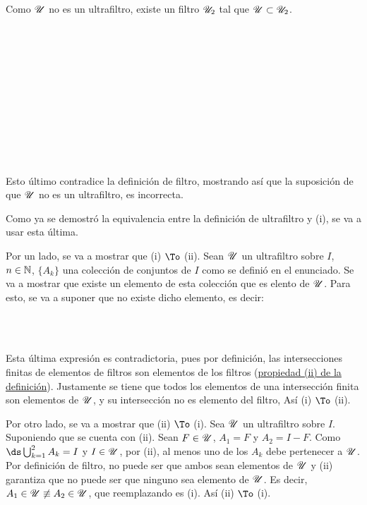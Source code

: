 \begin{demo}[i]
  Como $\mathscr{U}$ no es un ultrafiltro, existe un filtro $\mathscr{U}_2$ tal que
  $\mathscr{U} \subset \mathscr{U}_2$.
  \begin{longderivation}
      \\
    \equiv\\
      \\
    \\
      \\
    \\
      \\
    \equiv\\
      \\
    \\
  \end{longderivation}
  Esto último contradice la definición de filtro, mostrando así que la
  suposición de que $\mathscr{U}$ no es un ultrafiltro, es incorrecta.
\end{demo}
\begin{demo}[ii]
  Como ya se demostró la equivalencia entre la definición de
  ultrafiltro y (i), se va a usar esta última.

  Por un lado, se va a mostrar que (i) $\To$ (ii).
  Sean $\mathscr{U}$ un ultrafiltro sobre $I$, $n\in\mathbb{N}$, $\{A_k\}$ una colección
  de conjuntos de $I$ como se definió en el enunciado. Se va a mostrar
  que existe un elemento de esta colección que es elento de $\mathscr{U}$. Para
  esto, se va a suponer que no existe dicho elemento, es decir:
  \begin{longderivation}
      \\
    \\
  \end{longderivation}
  Esta última expresión es contradictoria, pues por definición, las
  intersecciones finitas de elementos de filtros son elementos de los
  filtros (\hyperref[def:filtro]{propiedad (ii) de la definición}).
  Justamente se tiene que todos los elementos de una intersección finita
  son elementos de $\mathscr{U}$, y su intersección no es elemento del filtro, Así
  (i) $\To$ (ii).

  Por otro lado, se va a mostrar que (ii) $\To$ (i). Sea $\mathscr{U}$ un
  ultrafiltro sobre $I$. Suponiendo que se cuenta con (ii). Sean
  $F \in \mathscr{U}$, $A_1 = F$ y $A_2 = I-F$. Como $\ds\bigcup_{k=1}^2 A_k = I$
  y $I\in\mathscr{U}$, por (ii), al menos uno de los $A_k$ debe pertenecer a $\mathscr{U}$.
  Por definición de filtro, no puede ser que ambos sean elementos de $\mathscr{U}$
  y (ii) garantiza que no puede ser que ninguno sea elemento de $\mathscr{U}$. Es decir,
  $A_1\in\mathscr{U} \not\equiv A_2\in\mathscr{U}$, que reemplazando es (i). Así
  (ii) $\To$ (i).
\end{demo}

